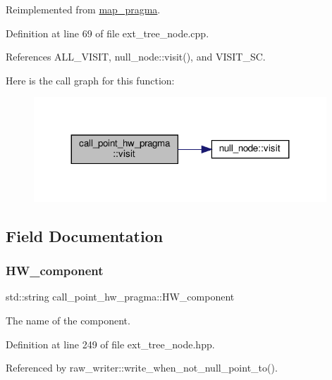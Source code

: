 Reimplemented from \hyperlink{structmap__pragma_a418af88fad63d1e91a1d1b12bc19b70c}{map\+\_\+pragma}.



Definition at line 69 of file ext\+\_\+tree\+\_\+node.\+cpp.



References A\+L\+L\+\_\+\+V\+I\+S\+IT, null\+\_\+node\+::visit(), and V\+I\+S\+I\+T\+\_\+\+SC.

Here is the call graph for this function\+:
\nopagebreak
\begin{figure}[H]
\begin{center}
\leavevmode
\includegraphics[width=311pt]{d6/d35/structcall__point__hw__pragma_a3c039efe1da66ca0ab6445535aaa6eb2_cgraph}
\end{center}
\end{figure}


\subsection{Field Documentation}
\mbox{\label{structcall__point__hw__pragma_a3877fe6ff40d15bc39f0ca97d03626df}} 
\subsubsection{\texorpdfstring{H\+W\+\_\+component}{HW\_component}}
{\footnotesize\ttfamily std\+::string call\+\_\+point\+\_\+hw\+\_\+pragma\+::\+H\+W\+\_\+component}



The name of the component. 



Definition at line 249 of file ext\+\_\+tree\+\_\+node.\+hpp.



Referenced by raw\+\_\+writer\+::write\+\_\+when\+\_\+not\+\_\+null\+\_\+point\+\_\+to().

